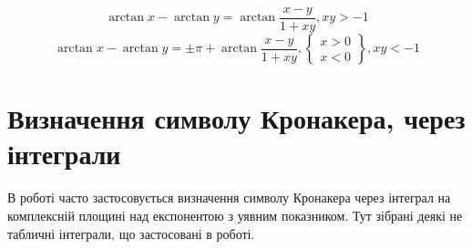 %
\begin{equation}
\arctan x - \arctan y = 
\arctan \frac{x-y}{1+xy}, xy > -1 
\end{equation}
%
\begin{equation}
\arctan x - \arctan y = \pm \pi + \arctan \frac{x-y}{1+xy}, 
\left\{ \begin{array}{c} x > 0 \\ x < 0  \end{array} \right\}, xy < -1 
\end{equation}

\section{Визначення символу Кронакера, через інтеграли}

В роботі часто застосовується визначення символу Кронакера через 
інтеграл на комплексній площині над експонентою з уявним показником.
Тут зібрані деякі не табличні інтеграли, що застосовані в роботі. 

